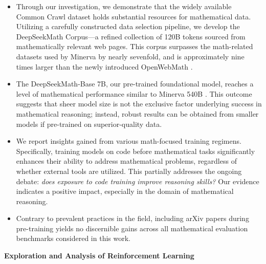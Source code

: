 \begin{itemize}[topsep=0pt]
    \item Through our investigation, we demonstrate that the widely available Common Crawl dataset holds substantial resources for mathematical data. Utilizing a carefully constructed data selection pipeline, we develop the DeepSeekMath Corpus—a refined collection of 120B tokens sourced from mathematically relevant web pages. This corpus surpasses the math-related datasets used by Minerva \citep{minerva} by nearly sevenfold, and is approximately nine times larger than the newly introduced OpenWebMath \citep{openwebmath}.

    \item The DeepSeekMath-Base 7B, our pre-trained foundational model, reaches a level of mathematical performance similar to Minerva 540B \citep{minerva}. This outcome suggests that sheer model size is not the exclusive factor underlying success in mathematical reasoning; instead, robust results can be obtained from smaller models if pre-trained on superior-quality data.

    \item We report insights gained from various math-focused training regimens. Specifically, training models on code before mathematical tasks significantly enhances their ability to address mathematical problems, regardless of whether external tools are utilized. This partially addresses the ongoing debate: \textit{does exposure to code training improve reasoning skills?} Our evidence indicates a positive impact, especially in the domain of mathematical reasoning.

    \item Contrary to prevalent practices in the field, including arXiv papers during pre-training yields no discernible gains across all mathematical evaluation benchmarks considered in this work.
\end{itemize}

\textbf{Exploration and Analysis of Reinforcement Learning}

